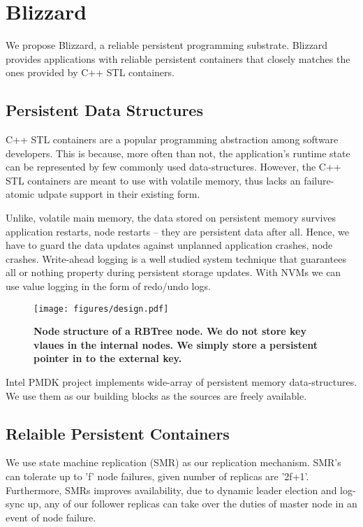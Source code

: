 \section{Blizzard}
We propose Blizzard, a reliable persistent programming substrate. Blizzard provides applications
with reliable persistent containers that closely matches the ones provided by C++ STL containers.

\subsection{Persistent Data Structures}

C++ STL containers are a popular programming abstraction among software developers. This is because,
more often than not, the application's runtime state can be represented by few commonly used 
data-structures.  However, the C++ STL containers are meant to use with volatile memory, thus
lacks an failure-atomic udpate support in their existing form.

Unlike, volatile main memory, the data stored on persistent memory survives application restarts,
node restarts -- they are persistent data after all. Hence, we have to guard the data updates 
against unplanned application crashes, node crashes. Write-ahead logging is a well studied
system technique that guarantees all or nothing property during persistent storage updates.
With NVMs we can use value logging in the form of redo/undo logs.

\begin{figure}[]   
	\centering
	\texttt{[image: figures/design.pdf]} 
	\caption{\bf Node structure of a RBTree node. We do not store key vlaues in the internal nodes. We simply
	store a persistent pointer in to the external key.} 
	\label{fig:zerocopy} 
\end{figure}

Intel PMDK project implements wide-array of persistent memory data-structures. 
We use them as our building blocks as the sources are freely available. 

\subsection{Relaible Persistent Containers}

We use state machine replication (SMR) as our replication mechanism. SMR's can tolerate
up to 'f' node failures, given number of replicas are '2f+1'. Furthermore, SMRs improves
availability, due to dynamic leader election and log-sync up, any of our follower replicas
can take over the duties of master node in an event of node failure.

